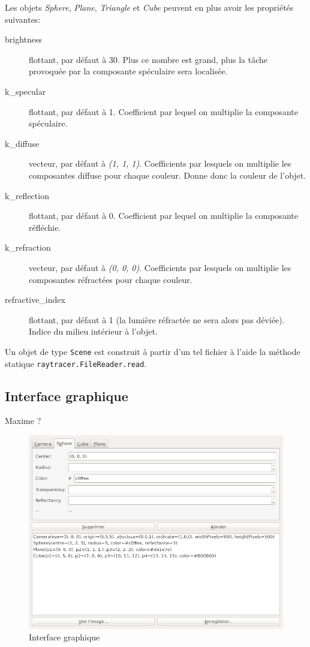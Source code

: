 \documentclass[a4paper]{article}
\begin{document}
    \bigskip
    Les objets \textit{Sphere}, \textit{Plane}, \textit{Triangle} et
    \textit{Cube} peuvent en plus avoir les propriétés suivantes:
    \begin{description}
      \item[brightness] flottant, par défaut à 30. Plus ce nombre est grand, plus la tâche provoquée par la composante spéculaire sera localisée.
      \item[k\_specular] flottant, par défaut à 1. Coefficient par lequel on multiplie la composante spéculaire.
      \item[k\_diffuse] vecteur, par défaut à \textit{(1, 1, 1)}. Coefficients par lesquels on multiplie les composantes diffuse pour chaque couleur. Donne donc la couleur de l'objet.
      \item[k\_reflection] flottant, par défaut à 0. Coefficient par lequel on multiplie la composante réfléchie.
      \item[k\_refraction] vecteur, par défaut à \textit{(0, 0, 0)}. Coefficients par lesquels on multiplie les composantes réfractées pour chaque couleur.
      \item[refractive\_index] flottant, par défaut à 1 (la lumière réfractée ne sera alors pas déviée). Indice du milieu intérieur à l'objet.
    \end{description}

    \bigskip
    Un objet de type \verb+Scene+ est construit à partir d'un tel fichier à
    l'aide la méthode statique \verb+raytracer.FileReader.read+.

  \subsection{Interface graphique}
    Maxime ?

    \begin{figure}[p]
      \centerline{\includegraphics[width=1.2\textwidth]{gui.png}}
    \caption{Interface graphique\label{fig:gui}}
    \end{figure}
\end{document}
